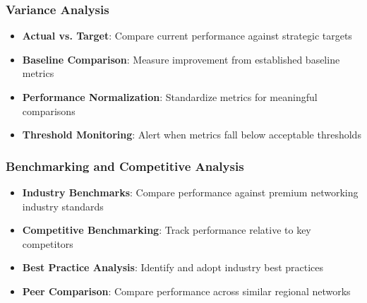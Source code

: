\subsubsection{Variance Analysis}
\begin{itemize}
    \item \textbf{Actual vs. Target}: Compare current performance against strategic targets
    \item \textbf{Baseline Comparison}: Measure improvement from established baseline metrics
    \item \textbf{Performance Normalization}: Standardize metrics for meaningful comparisons
    \item \textbf{Threshold Monitoring}: Alert when metrics fall below acceptable thresholds
\end{itemize}

\subsubsection{Benchmarking and Competitive Analysis}
\begin{itemize}
    \item \textbf{Industry Benchmarks}: Compare performance against premium networking industry standards
    \item \textbf{Competitive Benchmarking}: Track performance relative to key competitors
    \item \textbf{Best Practice Analysis}: Identify and adopt industry best practices
    \item \textbf{Peer Comparison}: Compare performance across similar regional networks
\end{itemize}

